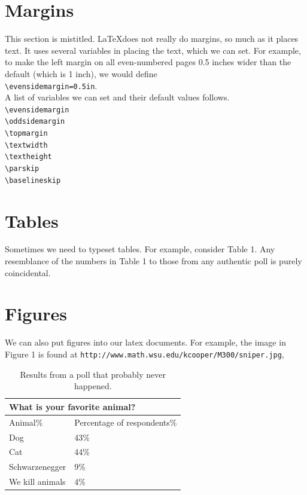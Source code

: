 \documentclass[12pt]{article}
\begin{document}
\noindent {}

\section{Margins}

This section is mistitled. \LaTeX does not really do margins, so much as it places text. It uses several variables in placing the text, which we can set. For example, to make the left margin on all even-numbered pages 0.5 inches wider than the default (which is 1 inch), we would define\\
\verb|\evensidemargin=0.5in|.\\
A list of variables we can set and their default values follows.\\
\noindent \verb|\evensidemargin|\\
\verb|\oddsidemargin|\\
\verb|\topmargin|\\
\verb|\textwidth|\\
\verb|\textheight|\\
\verb|\parskip|\\
\verb|\baselineskip|

\section{Tables}

Sometimes we need to typeset tables. For example, consider Table 1. Any resemblance of the numbers in Table 1 to those from any authentic poll is purely coincidental.

\section{Figures}

We can also put figures into our latex documents. For example, the image in Figure 1 is found at \verb|http://www.math.wsu.edu/kcooper/M300/sniper.jpg|,\\
\begin{table}[h]
\centering
\caption{\label{}Results from a poll that probably never happened.}
\begin{tabular}{||l|l|}
\hline
\multicolumn{2}{||l|}{What is your favorite animal?} \\
\hline
Animal\% & Percentage of respondents\% \\
\hline
Dog & 43\% \\
Cat & 44\% \\
Schwarzenegger & 9\% \\
We kill animals & 4\% \\
\hline
\hline
\end{tabular}
\end{table}
\end{document}

